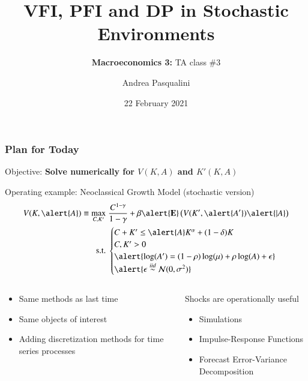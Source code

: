 \documentclass[10pt, aspectratio=1610, handout]{beamer}
\title[VFI, PFI and DP]{
  \textbf{VFI, PFI and DP in Stochastic Environments}
}
\subtitle[Macro 3: TA\#3]{
  \textbf{Macroeconomics 3:} TA class \#3
}
\author[A.~Pasqualini]{
  Andrea Pasqualini
}
\institute[Bocconi]{Bocconi University}
\date{
  22 February 2021
}
\begin{document}
  \begin{frame}
    \maketitle
  \end{frame}

  \begin{frame}
    \frametitle{Plan for Today}

    Objective: \textbf{Solve numerically for $V(K, A)$ and $K'(K, A)$}

    \vfill\pause

    Operating example: Neoclassical Growth Model (stochastic version)
    \begin{align*}
      V(K, \alert{A}) \equiv \max_{C, K'} &\; \frac{C^{1 - \gamma}}{1 - \gamma} + \beta \alert{\E} \left( V(K', \alert{A'}) \alert{| A} \right) \\
      \text{s.t.} &\;
      \begin{cases}
        C + K' \leq \alert{A} K^\alpha + (1 - \delta) K \\
        C, K' > 0 \\
        \alert{\log(A') = (1-\rho) \log(\mu) + \rho \log(A) + \epsilon} \\
        \alert{\epsilon \overset{iid}{\sim} \mathcal{N}(0, \sigma^2)}
      \end{cases}
    \end{align*}

    \vfill\pause

    \begin{columns}[T]
      \begin{column}{0.45\textwidth}
        \begin{itemize}
          \item Same methods as last time
          \item Same objects of interest
          \item Adding discretization methods for time series processes
        \end{itemize}
      \end{column}
      \begin{column}{0.45\textwidth}
        Shocks are operationally useful
        \begin{itemize}
          \item Simulations
          \item Impulse-Response Functions
          \item Forecast Error-Variance Decomposition
        \end{itemize}
      \end{column}
    \end{columns}

  \end{frame}
\end{document}
